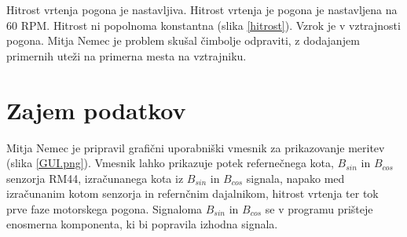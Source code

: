 Hitrost vrtenja pogona je nastavljiva.
Hitrost vrtenja je pogona je nastavljena na 60 RPM. Hitrost ni popolnoma konstantna (slika \ref{hitrost}). Vzrok je v vztrajnosti pogona. Mitja Nemec je problem skušal čimbolje odpraviti, z dodajanjem primernih uteži na primerna mesta na vztrajniku.
\newpage
\section{Zajem podatkov}
Mitja Nemec je pripravil grafični uporabniški vmesnik za prikazovanje meritev (slika \ref{GUI.png}).
Vmesnik lahko prikazuje potek refernečnega kota, $B_{sin}$ in $B_{cos}$ senzorja RM44, izračunanega kota iz $B_{sin}$ in $B_{cos}$ signala, napako med izračunanim kotom senzorja in refernčnim dajalnikom, hitrost vrtenja ter tok prve faze motorskega pogona. Signaloma $B_{sin}$ in $B_{cos}$ se v programu prišteje enosmerna komponenta, ki bi popravila izhodna signala.

